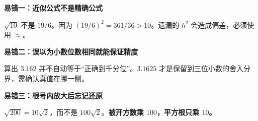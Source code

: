 \clearpage
\begin{trapbox}
\textbf{\textcolor{CTrap}{易错一：近似公式不是精确公式}}
\par\medskip
\begin{center}

\end{center}
\medskip
$\sqrt{10}$ 不是 $19/6$。因为 $(19/6)^2=361/36>10$。遗漏的 $h^2$ 会造成偏差，必须使用 $\approx$。
\end{trapbox}
\clearpage
\begin{trapbox}
\textbf{\textcolor{CTrap}{易错二：误以为小数位数相同就能保证精度}}
\par\medskip
\begin{center}

\end{center}
\medskip
算出 $3.162$ 并不自动等于“正确到千分位”。$3.1625$ 才是保留到三位小数的舍入分界，需确认真值在哪一侧。
\end{trapbox}
\clearpage
\begin{trapbox}
\textbf{\textcolor{CTrap}{易错三：根号内放大后忘记还原}}
\par\medskip
\begin{center}

\end{center}
\medskip
$\sqrt{200}=10\sqrt2$，而不是 $100\sqrt2$。\textbf{被开方数乘 $100$，平方根只乘 $10$。}
\end{trapbox}
